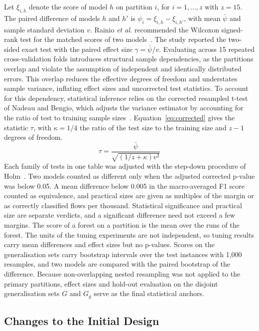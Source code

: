 \documentclass[10pt,conference]{IEEEtran}
\begin{document}
Let $\xi_{i,h}$ denote the score of model $h$ on partition $i$, for $i = 1, \ldots, z$ with $z = 15$. The paired difference of models $h$ and $h'$ is $\psi_i = \xi_{i,h} - \xi_{i,h'}$, with mean $\bar{\psi}$ and sample standard deviation $v$. Rainio \textit{et al.} recommended the Wilcoxon signed-rank test for the matched scores of two models~\cite{rainio2024}. The study reported the two-sided exact test with the paired effect size $\gamma = \bar{\psi} / v$. Evaluating across 15 repeated cross-validation folds introduces structural sample dependencies, as the partitions overlap and violate the assumption of independent and identically distributed errors. This overlap reduces the effective degrees of freedom and understates sample variance, inflating effect sizes and uncorrected test statistics. To account for this dependency, statistical inference relies on the corrected resampled t-test of Nadeau and Bengio, which adjusts the variance estimator by accounting for the ratio of test to training sample sizes~\cite{nadeau2003}. Equation~\eqref{eq:corrected} gives the statistic $\tau$, with $\kappa = 1/4$ the ratio of the test size to the training size and $z - 1$ degrees of freedom.
\begin{equation}
\label{eq:corrected}
\tau = \frac{\bar{\psi}}{\sqrt{\left( 1/z + \kappa \right) v^{2}}}
\end{equation}
Each family of tests in one table was adjusted with the step-down procedure of Holm~\cite{holm1979}. Two models counted as different only when the adjusted corrected p-value was below 0.05. A mean difference below 0.005 in the macro-averaged F1 score counted as equivalence, and practical sizes are given as multiples of the margin or as correctly classified flows per thousand. Statistical significance and practical size are separate verdicts, and a significant difference need not exceed a few margins. The score of a forest on a partition is the mean over the runs of the forest. The units of the tuning experiments are not independent, so tuning results carry mean differences and effect sizes but no p-values. Scores on the generalisation sets carry bootstrap intervals over the test instances with 1,000 resamples, and two models are compared with the paired bootstrap of the difference. Because non-overlapping nested resampling was not applied to the primary partitions, effect sizes and hold-out evaluation on the disjoint generalisation sets $G$ and $G_{g}$ serve as the final statistical anchors.

\subsection{Changes to the Initial Design}
\label{sec:procedure-deviations}
\end{document}
